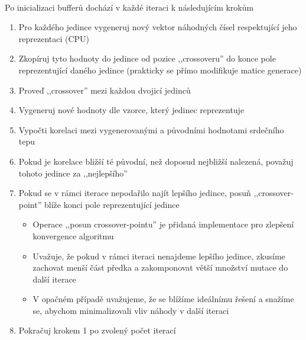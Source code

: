 \documentclass[12pt, a4paper]{article}
\begin{document}
\paragraph{} Po inicializaci bufferů dochází v každé iteraci k následujícím krokům 
\begin{enumerate}
  \item Pro každého jedince vygeneruj nový vektor náhodných čísel respektující jeho reprezentaci (CPU)
  \item Zkopíruj tyto hodnoty do jedince od pozice ,,crossoveru'' do konce pole reprezentující daného jedince (prakticky se přímo modifikuje matice generace)
  \item Proveď ,,crossover'' mezi každou dvojicí jedinců
  \item Vygeneruj nové hodnoty dle vzorce, který jedinec reprezentuje
  \item Vypočti korelaci mezi vygenerovanými a původními hodnotami srdečního tepu
  \item Pokud je korelace bližší té původní, než doposud nejbližší nalezená, považuj tohoto jedince za ,,nejlepšího''
  \item Pokud se v rámci iterace nepodařilo najít lepšího jedince, posuň ,,crossover-point'' blíže konci pole reprezentující jedince
   \begin{itemize}
      \item Operace ,,posun crossover-pointu'' je přidaná implementace pro zlepšení konvergence algoritmu
      \item Uvažuje, že pokud v rámci iteraci nenajdeme lepšího jedince, zkusíme zachovat menší část předka a zakomponovat větší množství mutace do další iterace
      \item V opačném případě uvažujeme, že se blížíme ideálnímu řešení a snažíme se, abychom minimalizovali vliv náhody v další iteraci
   \end{itemize}
 \item Pokračuj krokem 1 po zvolený počet iterací
\end{enumerate}
\end{document}
